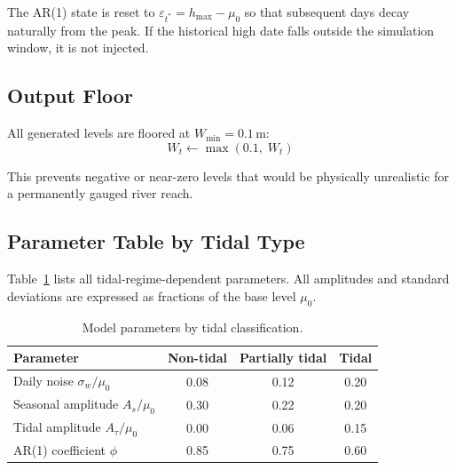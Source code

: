 \documentclass[11pt,a4paper]{article}
\begin{document}
\noindent The AR(1) state is reset to $\varepsilon_{t^*} = h_{\text{max}} - \mu_0$ so
that subsequent days decay naturally from the peak. If the historical high date falls
outside the simulation window, it is not injected.

\subsection{Output Floor}

All generated levels are floored at $W_{\min} = 0.1$\,m:
\begin{equation}
    W_t \leftarrow \max(0.1,\; W_t)
    \label{eq:floor}
\end{equation}

\noindent This prevents negative or near-zero levels that would be physically unrealistic
for a permanently gauged river reach.

\mkminputs

\subsection{Parameter Table by Tidal Type}

Table~\ref{tab:tidal_params} lists all tidal-regime-dependent parameters. All amplitudes
and standard deviations are expressed as fractions of the base level $\mu_0$.

\begin{table}[H]
    \centering
    \caption{Model parameters by tidal classification.}
    \label{tab:tidal_params}
    \begin{tabular}{lccc}
        \toprule
        \textbf{Parameter} & \textbf{Non-tidal} & \textbf{Partially tidal} & \textbf{Tidal} \\
        \midrule
        Daily noise $\sigma_w / \mu_0$
            & 0.08 & 0.12 & 0.20 \\
        Seasonal amplitude $A_s / \mu_0$
            & 0.30 & 0.22 & 0.20 \\
        Tidal amplitude $A_{\tau} / \mu_0$
            & 0.00 & 0.06 & 0.15 \\
        AR(1) coefficient $\phi$
            & 0.85 & 0.75 & 0.60 \\
        \bottomrule
    \end{tabular}
\end{table}
\end{document}
